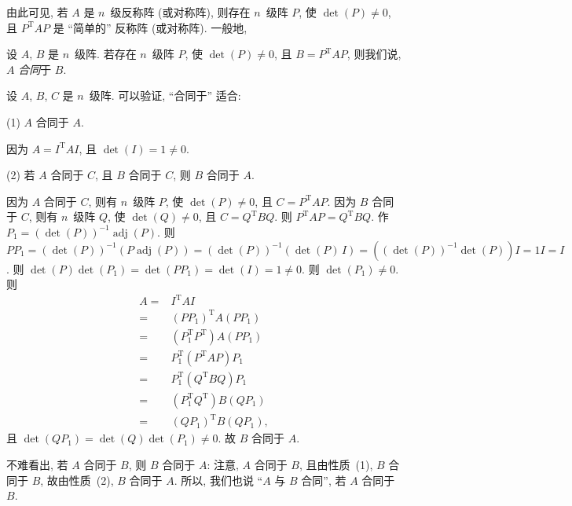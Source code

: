 \documentclass[../libro.tex]{subfiles}
\begin{document}
由此可见, 若 \(A\) 是 \(n\)~级反称阵 (或对称阵),
则存在 \(n\)~级阵 \(P\),
使 \(\det {(P)} \neq 0\),
且 \(P^{\mathrm{T}} A P\) 是
``简单的'' 反称阵 (或对称阵).
一般地,

\begin{definition}
    设 \(A\), \(B\) 是 \(n\)~级阵.
    若存在 \(n\)~级阵 \(P\),
    使 \(\det {(P)} \neq 0\),
    且 \(B = P^{\mathrm{T}} A P\),
    则我们说, \(A\) \emph{合同}于 \(B\).
\end{definition}

设 \(A\), \(B\), \(C\) 是 \(n\)~级阵.
可以验证, ``合同于'' 适合:

(1)
\(A\) 合同于 \(A\).

因为 \(A = I^{\mathrm{T}} A I\),
且 \(\det {(I)} = 1 \neq 0\).

(2)
若 \(A\) 合同于 \(C\), 且 \(B\) 合同于 \(C\),
则 \(B\) 合同于 \(A\).

因为 \(A\) 合同于 \(C\),
则有 \(n\)~级阵 \(P\),
使 \(\det {(P)} \neq 0\),
且 \(C = P^{\mathrm{T}} A P\).
因为 \(B\) 合同于 \(C\),
则有 \(n\)~级阵 \(Q\),
使 \(\det {(Q)} \neq 0\),
且 \(C = Q^{\mathrm{T}} B Q\).
则 \(P^{\mathrm{T}} A P = Q^{\mathrm{T}} B Q\).
作 \(P_1 = (\det {(P)})^{-1} \operatorname{adj} {(P)}\).
则 \(P P_1
    = (\det {(P)})^{-1} (P \operatorname{adj} {(P)})
    = (\det {(P)})^{-1} (\det {(P)}\, I)
    = ((\det {(P)})^{-1} \det {(P)}) I
    = 1 I
= I\).
则 \(\det {(P)} \det {(P_1)}
= \det {(P P_1)} = \det {(I)} = 1 \neq 0\).
则 \(\det {(P_1)} \neq 0\).
则
\begin{align*}
    A
    = {} &
    I^{\mathrm{T}} A I
    \\
    = {} &
    (P P_1)^{\mathrm{T}} A (P P_1)
    \\
    = {} &
    (P_1^{\mathrm{T}} P^{\mathrm{T}})
    A
    (P P_1)
    \\
    = {} &
    P_1^{\mathrm{T}}
    (P^{\mathrm{T}} A P)
    P_1
    \\
    = {} &
    P_1^{\mathrm{T}}
    (Q^{\mathrm{T}} B Q)
    P_1
    \\
    = {} &
    (P_1^{\mathrm{T}} Q^{\mathrm{T}})
    B
    (Q P_1)
    \\
    = {} &
    (Q P_1)^{\mathrm{T}} B (Q P_1),
\end{align*}
且 \(\det {(Q P_1)} = \det {(Q)} \det {(P_1)} \neq 0\).
故 \(B\) 合同于 \(A\).

不难看出, 若 \(A\) 合同于 \(B\), 则 \(B\) 合同于 \(A\):
注意, \(A\) 合同于 \(B\),
且由性质~(1), \(B\) 合同于 \(B\),
故由性质~(2), \(B\) 合同于 \(A\).
所以, 我们也说 ``\(A\) 与 \(B\) 合同'',
若 \(A\) 合同于 \(B\).
\end{document}
